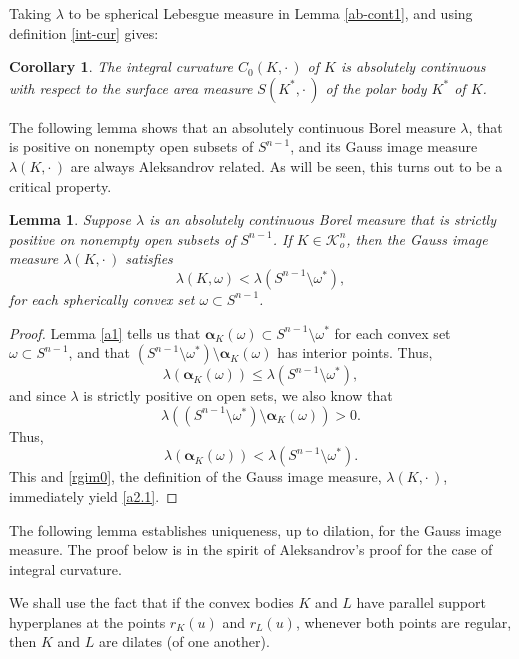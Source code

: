 \documentclass{cpamart1}     %
\newtheorem{lemm}[theo]{Lemma}
\newtheorem{coro}[theo]{Corollary}
\theoremstyle{definition}
\theoremstyle{remark}
\newcommand{\sn}{S^{n-1}}
\newcommand{\kno}{\mathcal K^n_o}
\newcommand{\balpha}{\pmb{\alpha}}
\begin{document}
Taking $\lambda$ to be spherical Lebesgue measure in Lemma \ref{ab-cont1},
and using definition \eqref{int-cur} gives:


\begin{coro}\label{ab-cont}
The integral curvature $C_0(K,\cdot\,)$ of $K$ is absolutely continuous with respect to
the surface area measure $S(K^*,\cdot\,)$ of the polar body $K^*$ of $K$.
\end{coro}


The following lemma shows that an absolutely continuous Borel measure $\lambda$, that is positive
on nonempty open subsets of $\sn$, and its Gauss image measure $\lambda(K,\cdot\,)$
are always Aleksandrov related. As will be seen, this turns out to be a critical property.


\begin{lemm}\label{a2}
Suppose $\lambda$ is an absolutely continuous Borel measure that
is strictly positive on nonempty open subsets of $\sn$.
If $K\in \kno$, then the
Gauss image measure $\lambda(K,\cdot\,)$ satisfies
\begin{equation}\label{a2.1}
\lambda(K,\omega) < \lambda (\sn \setminus \omega^*),
\end{equation}
for each spherically convex set $\omega \subset \sn$.
\end{lemm}


\begin{proof}
Lemma \ref{a1} tells us that $\balpha_K(\omega) \subset \sn \setminus \omega^*$
for each convex set $\omega \subset \sn$, and that
 $(\sn \setminus \omega^*) \setminus \balpha_K(\omega)$ has interior points.
Thus,
\[
\lambda(\balpha_K(\omega)) \le \lambda(\sn \setminus \omega^*),
\]
and since $\lambda$ is strictly positive on open sets, we also know that
\[
\lambda((\sn \setminus \omega^*) \setminus \balpha_K(\omega))>0.
\]
Thus,
\[
\lambda(\balpha_K(\omega)) < \lambda(\sn \setminus \omega^*).
\]
This and \eqref{rgim0}, the definition of the Gauss image measure, $\lambda(K,\cdot\,)$,
immediately yield \eqref{a2.1}.
\end{proof}





The following lemma establishes uniqueness, up to dilation, for the Gauss image measure.
The proof below is in the spirit of Aleksandrov's proof for the case of integral curvature.


We shall use the fact that if the convex bodies $K$ and $L$ have parallel support hyperplanes
at the points $r_K(u)$ and $r_L(u)$, whenever both points are regular, then $K$ and $L$
are  dilates (of one another).
\end{document}
